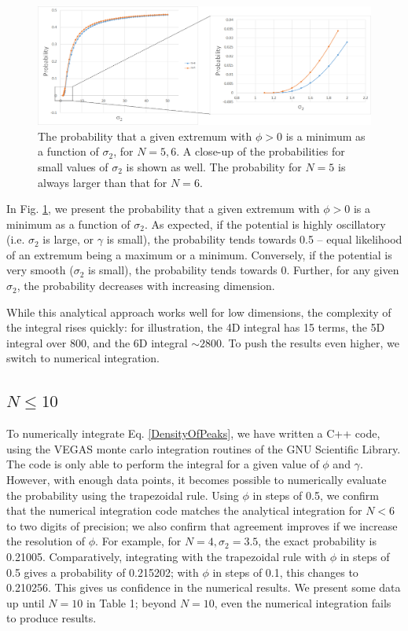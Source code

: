 \documentclass[12pt]{article}
\begin{document}
\begin{figure}
  \centering
  \includegraphics[width=\linewidth]{N6minima.png}
  \caption{The probability that a given extremum with $\phi > 0$ is a minimum as a function of $\sigma_2$, for $N=5,6$. A close-up of the probabilities for small values of $\sigma_2$ is shown as well. The probability for $N=5$ is always larger than that for $N=6$.}
  \label{N6}
\end{figure}

In Fig. \ref{N6}, we present the probability that a given extremum with $\phi > 0$ is a minimum as a function of $\sigma_2$. As expected, if the potential is highly oscillatory (i.e. $\sigma_2$ is large, or $\gamma$ is small), the probability tends towards 0.5 -- equal likelihood of an extremum being a maximum or a minimum. Conversely, if the potential is very smooth ($\sigma_2$ is small), the probability tends towards 0. Further, for any given $\sigma_2$, the probability decreases with increasing dimension.

While this analytical approach works well for low dimensions, the complexity of the integral rises quickly: for illustration, the 4D integral has 15 terms, the 5D integral over 800, and the 6D integral $\sim2800$. To push the results even higher, we switch to numerical integration.

\subsection{$N \leq 10$}
To numerically integrate Eq. \ref{DensityOfPeaks}, we have written a C++ code, using the VEGAS \cite{VEGAS} monte carlo integration routines of the GNU Scientific Library.\cite{GSL} The code is only able to perform the integral for a given value of $\phi$ and $\gamma$. However, with enough data points, it becomes possible to numerically evaluate the probability using the trapezoidal rule. Using $\phi$ in steps of 0.5, we confirm that the numerical integration code matches the analytical integration for $N < 6$ to two digits of precision; we also confirm that agreement improves if we increase the resolution of $\phi$. For example, for $N=4, \sigma_2=3.5$, the exact probability is 0.21005. Comparatively, integrating with the trapezoidal rule with $\phi$ in steps of 0.5 gives a probability of 0.215202; with $\phi$ in steps of 0.1, this changes to 0.210256. This gives us confidence in the numerical results. We present some data up until $N = 10$ in Table 1; beyond $N = 10$, even the numerical integration fails to produce results.
\end{document}
